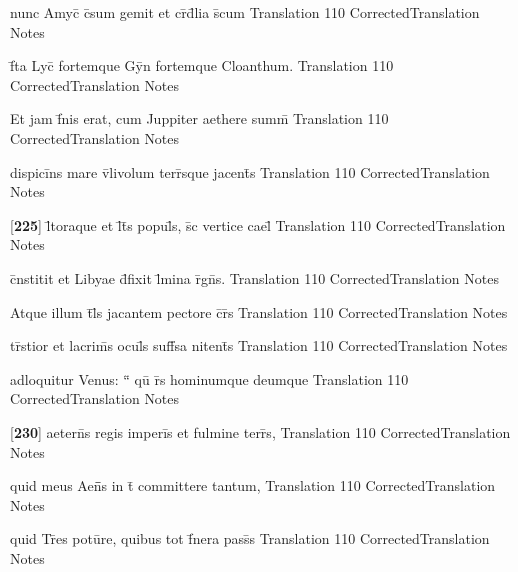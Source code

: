 \documentclass[]{book}
\begin{document}
\latline
  {nunc Amyc\={\macron {\i}} c\={}sum gemit et cr\={}d\={}lia s\={}cum}
  { Translation }
  {110}
  { CorrectedTranslation }
  { Notes }


\latline
  {f\={}ta Lyc\={\macron {\i}} fortemque Gy\={}n fortemque Cloanthum.}
  { Translation }
  {110}
  { CorrectedTranslation }
  { Notes }


\latline
  {Et jam f\={\macron {\i}}nis erat, cum Juppiter aethere summ\={}}
  { Translation }
  {110}
  { CorrectedTranslation }
  { Notes }


\latline
  {dispici\={}ns mare v\={}livolum terr\={}sque jacent\={\macron {\i}}s}
  { Translation }
  {110}
  { CorrectedTranslation }
  { Notes }


\latline
  {[\textbf{225}] l\={\macron {\i}}toraque et l\={}t\={}s popul\={}s, s\={\macron {\i}}c vertice cael\={\macron {\i}}}
  { Translation }
  {110}
  { CorrectedTranslation }
  { Notes }


\latline
  {c\={}nstitit et Libyae d\={}fixit l\={}mina r\={}gn\={\macron {\i}}s.}
  { Translation }
  {110}
  { CorrectedTranslation }
  { Notes }


\latline
  {Atque illum t\={}l\={\macron {\i}}s jacantem pectore c\={}r\={}s}
  { Translation }
  {110}
  { CorrectedTranslation }
  { Notes }


\latline
  {tr\={\macron {\i}}stior et lacrim\={\macron {\i}}s ocul\={}s suff\={}sa nitent\={\macron {\i}}s}
  { Translation }
  {110}
  { CorrectedTranslation }
  { Notes }


\latline
  {adloquitur Venus: ``\={} qu\={\macron {\i}} r\={}s hominumque deumque}
  { Translation }
  {110}
  { CorrectedTranslation }
  { Notes }


\latline
  {[\textbf{230}] aetern\={\macron {\i}}s regis imperi\={\macron {\i}}s et fulmine terr\={}s,}
  { Translation }
  {110}
  { CorrectedTranslation }
  { Notes }


\latline
  {quid meus Aen\={}\={}s in t\={} committere tantum,}
  { Translation }
  {110}
  { CorrectedTranslation }
  { Notes }


\latline
  {quid Tr\={}es potu\={}re, quibus tot f\={}nera pass\={\macron {\i}}s}
  { Translation }
  {110}
  { CorrectedTranslation }
  { Notes }
\end{document}
